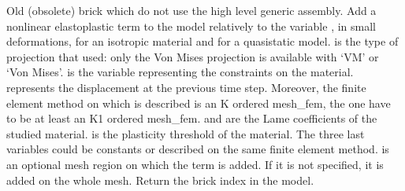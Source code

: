 \documentclass[a4paper,11pt,english]{sphinxmanual}
\begin{document}
\begin{fulllineitems}
\begin{fulllineitems}
\end{fulllineitems}


\begin{fulllineitems}
\label{\detokenize{python/cmdref_Model:getfem.Model.add_elastoplasticity_brick}}
Old (obsolete) brick which do not use the high level generic
assembly. Add a nonlinear elastoplastic term to the model relatively
to the variable , in small deformations, for an isotropic
material and for a quasistatic model.  is the type of
projection that used: only the Von Mises projection is
available with ‘VM’ or ‘Von Mises’.
 is the variable representing the constraints on the material.
 represents the displacement at the previous time step.
Moreover, the finite element method on which  is described
is an K ordered mesh\_fem, the  one have to be at least
an K\sphinxhyphen{}1 ordered mesh\_fem.
 and  are the Lame coefficients of the studied
material.
 is the plasticity threshold of the material.
The three last variables could be constants or described on the
same finite element method.
 is an optional mesh region on which the term is added.
If it is not specified, it is added on the whole mesh.
Return the brick index in the model.

\end{fulllineitems}



\end{fulllineitems}
\end{document}
